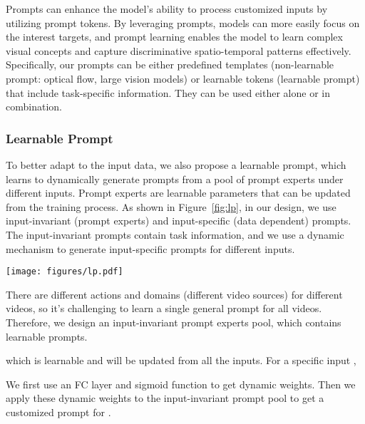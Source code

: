 \documentclass[letterpaper, 10 pt, conference]{ieeeconf}
\begin{document}
Prompts can enhance the model's ability to process customized inputs by utilizing prompt tokens. By leveraging prompts, models can more easily focus on the interest targets, and prompt learning enables the model to learn complex visual concepts and capture discriminative spatio-temporal patterns effectively. Specifically, our prompts can be either predefined templates (non-learnable prompt: optical flow, large vision models) or learnable tokens (learnable prompt) that include task-specific information. They can be used either alone or in combination.

\subsubsection{Learnable Prompt}
To better adapt to the input data, we also propose a learnable prompt, which learns to dynamically generate prompts from a pool of prompt experts under different inputs. Prompt experts are learnable parameters that can be updated from the training process. As shown in Figure~\ref{fig:lp}, in our design, we use input-invariant (prompt experts) and input-specific (data dependent) prompts. The input-invariant prompts contain task information, and we use a dynamic mechanism to generate input-specific prompts for different inputs. 
\begin{figure*}
    \centering
    \texttt{[image: figures/lp.pdf]}
    \vspace{-5mm}
    \caption{{\bf Learnable prompt:} Learning input-invariant (prompt experts) and input-specific (data dependent) prompt knowledge. The input-invariant prompts will be updated from all the inputs, which contain task information, and we use a dynamic mechanism to generate input-specific prompts for different inputs. Add/Mul means element-wise operations.  is the input features' shape, and  is the expert's number in the prompt pool.}
    \label{fig:lp} 
\end{figure*}

There are different actions and domains (different video sources) for different videos, so it's challenging to learn a single general prompt for all videos. Therefore, we design an input-invariant prompt experts pool, which contains  learnable prompts.
 
which is learnable and will be updated from all the inputs. For a specific input ,
 
We first use an FC layer and sigmoid function to get dynamic weights. Then we apply these dynamic weights to the input-invariant prompt pool to get a customized prompt  for .
 
\end{document}

